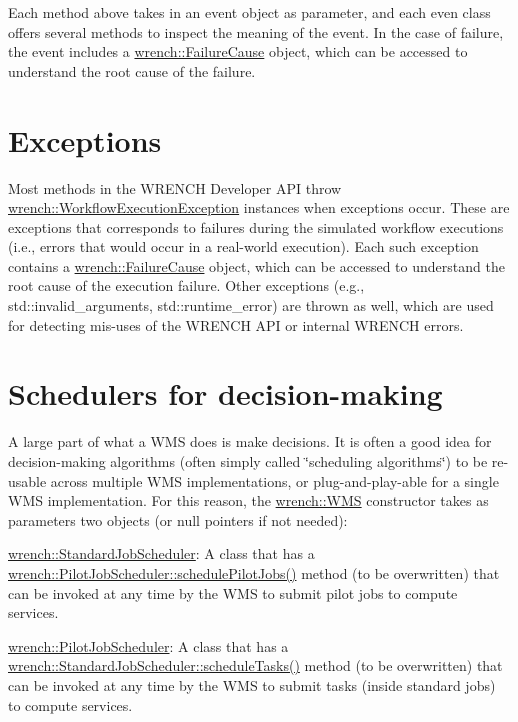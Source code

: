 Each method above takes in an event object as parameter, and each even class offers several methods to inspect the meaning of the event. In the case of failure, the event includes a {\ttfamily \hyperlink{classwrench_1_1_failure_cause}{wrench\+::\+Failure\+Cause}} object, which can be accessed to understand the root cause of the failure.\hypertarget{wrench-101_wrench-101-WMS-exceptions}{}\section{Exceptions}\label{wrench-101_wrench-101-WMS-exceptions}
Most methods in the W\+R\+E\+N\+CH Developer A\+PI throw {\ttfamily \hyperlink{classwrench_1_1_workflow_execution_exception}{wrench\+::\+Workflow\+Execution\+Exception}} instances when exceptions occur. These are exceptions that corresponds to failures during the simulated workflow executions (i.\+e., errors that would occur in a real-\/world execution). Each such exception contains a {\ttfamily \hyperlink{classwrench_1_1_failure_cause}{wrench\+::\+Failure\+Cause}} object, which can be accessed to understand the root cause of the execution failure. Other exceptions (e.\+g., {\ttfamily std\+::invalid\+\_\+arguments}, {\ttfamily std\+::runtime\+\_\+error}) are thrown as well, which are used for detecting mis-\/uses of the W\+R\+E\+N\+CH A\+PI or internal W\+R\+E\+N\+CH errors.\hypertarget{wrench-101_wrench-101-WMS-schedulers}{}\section{Schedulers for decision-\/making}\label{wrench-101_wrench-101-WMS-schedulers}
A large part of what a W\+MS does is make decisions. It is often a good idea for decision-\/making algorithms (often simply called \char`\"{}scheduling algorithms\char`\"{}) to be re-\/usable across multiple W\+MS implementations, or plug-\/and-\/play-\/able for a single W\+MS implementation. For this reason, the {\ttfamily \hyperlink{classwrench_1_1_w_m_s}{wrench\+::\+W\+MS}} constructor takes as parameters two objects (or null pointers if not needed)\+:


\begin{DoxyItemize}
\item {\ttfamily \hyperlink{classwrench_1_1_standard_job_scheduler}{wrench\+::\+Standard\+Job\+Scheduler}}\+: A class that has a {\ttfamily \hyperlink{classwrench_1_1_pilot_job_scheduler_a903c44145dfce2964f90cc856146adbb}{wrench\+::\+Pilot\+Job\+Scheduler\+::schedule\+Pilot\+Jobs()}} method (to be overwritten) that can be invoked at any time by the W\+MS to submit pilot jobs to compute services.
\item {\ttfamily \hyperlink{classwrench_1_1_pilot_job_scheduler}{wrench\+::\+Pilot\+Job\+Scheduler}}\+: A class that has a {\ttfamily \hyperlink{classwrench_1_1_standard_job_scheduler_a1ef07acfece4706f7f172c740a8015c3}{wrench\+::\+Standard\+Job\+Scheduler\+::schedule\+Tasks()}} method (to be overwritten) that can be invoked at any time by the W\+MS to submit tasks (inside standard jobs) to compute services.
\end{DoxyItemize}

